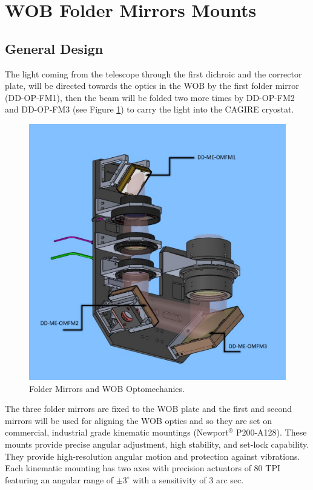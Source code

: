 \documentclass{report}
\begin{document}
\section{WOB Folder Mirrors Mounts}
\subsection{General Design}

The light coming from the telescope through the first dichroic and the corrector plate, will be directed towards the optics in the WOB by the first folder mirror (DD-OP-FM1), then the beam will be folded two more times by DD-OP-FM2 and DD-OP-FM3 (see Figure \ref{figure:FMs-WOB}) to carry the light into the CAGIRE cryostat.

\begin{figure}
\begin{center}
\includegraphics[width=0.7\linewidth]{figures/FMsCA-WOB.png}
\end{center}
\caption{Folder Mirrors and WOB Optomechanics.}
\label{figure:FMs-WOB}
\end{figure}

The three folder mirrors are fixed to the WOB plate and the first and second mirrors will be used for aligning the WOB optics and so they are set on commercial, industrial grade kinematic mountings (Newport${}^\circledR$ P200-A128). These mounts provide precise angular adjustment, high stability, and set-lock capability. They provide high-resolution angular motion and protection against vibrations. Each kinematic mounting has two axes with precision actuators of 80 TPI featuring an angular range of $\pm 3^\circ$ with a sensitivity of 3 arc sec.
\end{document}
